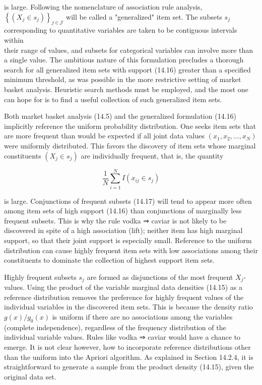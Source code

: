 \documentclass[10pt]{article}
\begin{document}
is large. Following the nomenclature of association rule analysis, $\left\{\left(X_{j} \in\right.\right. \left.\left.s_{j}\right)\right\}_{j \in \mathcal{J}}$ will be called a "generalized" item set. The subsets $s_{j}$ corresponding to quantitative variables are taken to be contiguous intervals within\\
their range of values, and subsets for categorical variables can involve more than a single value. The ambitious nature of this formulation precludes a thorough search for all generalized item sets with support (14.16) greater than a specified minimum threshold, as was possible in the more restrictive setting of market basket analysis. Heuristic search methods must be employed, and the most one can hope for is to find a useful collection of such generalized item sets.

Both market basket analysis (14.5) and the generalized formulation (14.16) implicitly reference the uniform probability distribution. One seeks item sets that are more frequent than would be expected if all joint data values $\left(x_{1}, x_{2}, \ldots, x_{N}\right)$ were uniformly distributed. This favors the discovery of item sets whose marginal constituents $\left(X_{j} \in s_{j}\right)$ are individually frequent, that is, the quantity


\begin{equation*}
\frac{1}{N} \sum_{i=1}^{N} I\left(x_{i j} \in s_{j}\right) \tag{14.17}
\end{equation*}


is large. Conjunctions of frequent subsets (14.17) will tend to appear more often among item sets of high support (14.16) than conjunctions of marginally less frequent subsets. This is why the rule vodka ⇒ caviar is not likely to be discovered in spite of a high association (lift); neither item has high marginal support, so that their joint support is especially small. Reference to the uniform distribution can cause highly frequent item sets with low associations among their constituents to dominate the collection of highest support item sets.

Highly frequent subsets $s_{j}$ are formed as disjunctions of the most frequent $X_{j}$-values. Using the product of the variable marginal data densities (14.15) as a reference distribution removes the preference for highly frequent values of the individual variables in the discovered item sets. This is because the density ratio $g(x) / g_{0}(x)$ is uniform if there are no associations among the variables (complete independence), regardless of the frequency distribution of the individual variable values. Rules like vodka ⇒ caviar would have a chance to emerge. It is not clear however, how to incorporate reference distributions other than the uniform into the Apriori algorithm. As explained in Section 14.2.4, it is straightforward to generate a sample from the product density (14.15), given the original data set.
\end{document}
